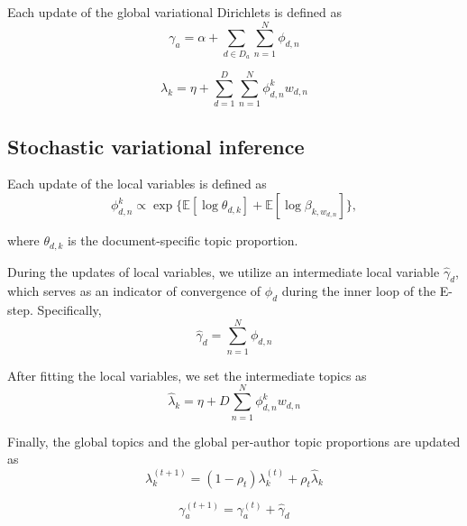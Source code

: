 Each update of the global variational Dirichlets is defined as
\begin{equation}
\gamma_a = \alpha + \sum_{d \in D_a}{\sum_{n=1}^{N}{\phi_{d,n}}}
\end{equation}

\begin{equation}
\lambda_k = \eta + \sum_{d=1}^{D}{\sum_{n=1}^{N}{\phi^k_{d,n}w_{d,n}}}
\end{equation}



\subsection{Stochastic variational inference}

Each update of the local variables is defined as
\begin{equation}
\phi^k_{d,n} \propto \exp \{ \mathbb{E}[\log \theta_{d,k}] + \mathbb{E}[\log \beta_{k,w_{d,n}}] \},
\end{equation}

\noindent where $\theta_{d,k}$ is the document-specific topic proportion.

During the updates of local variables, we utilize an intermediate local variable $\hat{\gamma}_d$, which serves as an indicator of convergence of $\phi_{d}$ during the inner loop of the E-step. Specifically,
\begin{equation}
\hat{\gamma}_d = \sum_{n=1}^{N}{\phi_{d,n}}
\end{equation}


After fitting the local variables, we set the intermediate topics as
\begin{equation}
\hat{\lambda}_k = \eta + D \sum_{n=1}^{N}{\phi^k_{d,n}w_{d,n}}
\end{equation}

Finally, the global topics and the global per-author topic proportions are updated as
\begin{equation}
\lambda^{(t+1)}_k = (1 - \rho_t) \lambda^{(t)}_k + \rho_t \hat{\lambda}_k
\end{equation}

\begin{equation}
\gamma^{(t+1)}_a = \gamma^{(t)}_a + \hat{\gamma}_d
\end{equation}




